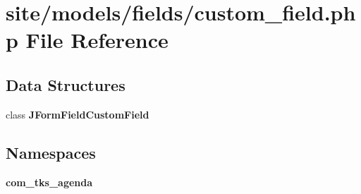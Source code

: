 \section{site/models/fields/custom\+\_\+field.php File Reference}
\label{site_2models_2fields_2custom__field_8php}
\subsection*{Data Structures}
\begin{DoxyCompactItemize}
\item 
class \textbf{ J\+Form\+Field\+Custom\+Field}
\end{DoxyCompactItemize}
\subsection*{Namespaces}
\begin{DoxyCompactItemize}
\item 
 \textbf{ com\+\_\+tks\+\_\+agenda}
\end{DoxyCompactItemize}

